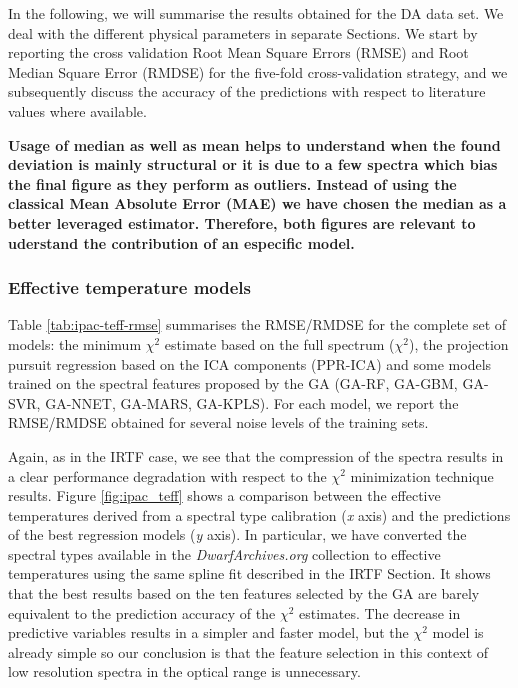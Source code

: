 
In the following, we will summarise the results obtained for the DA
data set. We deal with the different physical parameters in separate
Sections. We start by reporting the cross validation Root Mean Square
Errors (RMSE) and Root Median Square Error (RMDSE) for the five-fold
cross-validation strategy, and we subsequently discuss the accuracy of
the predictions with respect to literature values where available.

\textbf{
Usage of median as well as mean helps to understand when the found 
deviation is mainly structural or it is due to a few spectra which
bias the final figure as they perform as outliers. Instead of using the
classical Mean Absolute Error (MAE) we have chosen the median as a
better leveraged estimator.
Therefore, both figures are relevant to uderstand 
the contribution of an especific model.
}

\subsubsection{Effective temperature models}

Table \ref{tab:ipac-teff-rmse} summarises the RMSE/RMDSE for the
complete set of models: the minimum $\chi^2$ estimate based on the
full spectrum ($\chi^2$), the projection pursuit regression based on
the ICA components (PPR-ICA) and some models trained on the spectral
features proposed by the GA (GA-RF, GA-GBM, GA-SVR, GA-NNET, GA-MARS,
GA-KPLS). For each model, we report the RMSE/RMDSE obtained for
several noise levels of the training sets.

Again, as in the IRTF case, we see that the compression of the spectra
results in a clear performance degradation with respect to the
$\chi^2$ minimization technique results. Figure \ref{fig:ipac_teff} shows
a comparison between the effective temperatures derived from a
spectral type calibration ({\it x} axis) and the predictions of the
best regression models ({\it y} axis). In particular, we have
converted the spectral types available in the {\it DwarfArchives.org}
collection to effective temperatures using the same spline fit
described in the IRTF Section. It shows that the best results based on
the ten features selected by the GA are barely equivalent to the
prediction accuracy of the $\chi^2$ estimates. The decrease in
predictive variables results in a simpler and faster model, but the
$\chi^2$ model is already simple so our conclusion is that the feature
selection in this context of low resolution spectra in the optical
range is unnecessary.

